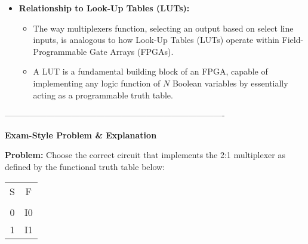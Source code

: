 \documentclass{article}
\begin{document}
\begin{itemize}
\begin{itemize}
    \end{itemize}
    \item \textbf{Relationship to Look-Up Tables (LUTs):}
    \begin{itemize}
        \item The way multiplexers function, selecting an output based on select line inputs, is analogous to how Look-Up Tables (LUTs) operate within Field-Programmable Gate Arrays (FPGAs).
        \item A LUT is a fundamental building block of an FPGA, capable of implementing any logic function of $N$ Boolean variables by essentially acting as a programmable truth table.
    \end{itemize}
\end{itemize}

\-------------------------------------------------------------------------------- 

\textbf{Exam-Style Problem \& Explanation}

\textbf{Problem:} Choose the correct circuit that implements the 2:1 multiplexer as defined by the functional truth table below:

\begin{tabular}{ c | c } 
S & F \\
\\ \hline

0 & I0 \\
1 & I1 \\

\end{tabular}
\end{document}
